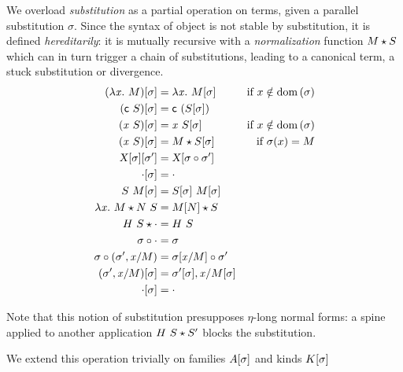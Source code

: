 \documentclass[9pt]{sigplanconf}
\begin{document}
We overload \emph{substitution} as a partial operation on terms, given
a parallel substitution $\sigma$. Since the syntax of object is not
stable by substitution, it is defined \emph{hereditarily}: it is
mutually recursive with a \emph{normalization} function ${M}\star{S}$
which can in turn trigger a chain of substitutions, leading to a
canonical term, a stuck substitution or divergence. %
\begin{align*}
  {(\lambda{\ensuremath{\text{\textit{x}}}}.\ M)}[{\sigma}] &= \lambda{\ensuremath{\text{\textit{x}}}}.\  {{M}[{\sigma}]} &
  \text{if $x\notin \operatorname{dom}{(\sigma)}$}
  \\
  {({\text{\textsf{c}}}\  S)}[{\sigma}] &= {\text{\textsf{c}}}\  {({S}[{\sigma}])}
  \\
  {({\text{\textit{x}}}\  S)}[{\sigma}] &=
  {\text{\textit{x}}}\  {{S}[{\sigma}]} &
  \text{if $x\notin \operatorname{dom}{(\sigma)}$}
  \\
  {({\text{\textit{x}}}\  S)}[{\sigma}] &=
  {M}\star{{S}[{\sigma}]} &
  \text{if $\sigma(x) = M$}
  \\
  {{\text{\textsl{X}}}[{\sigma}]}[{\sigma'}] &=
  {\text{\textsl{X}}}[{{\sigma}\circ{\sigma'}}]
  \\
  {\cdot}[{\sigma}] &=
  \cdot \\
  {{S}\ {M}}[{\sigma}] &=
  {{S}[{\sigma}]}\ {{M}[{\sigma}]}
  \\
  {\lambda{\ensuremath{\text{\textit{x}}}}.\  M}\star{{N}\ {S}} &=
  {{M}[{N}]}\star{S}
  \\
  {{H}\  S}\star{\cdot} &=
  {H}\  S
  \\
  {\sigma}\circ{\cdot} &=
  \sigma
  \\
  {\sigma}\circ{({\sigma'},{{\ensuremath{\text{\textit{x}}}}/{M}})} &=
  {{\sigma}[{{\text{\textit{x}}}/{M}}]}\circ{\sigma}'
  \\
  {({\sigma'},{{\text{\textit{x}}}/{M}})}[{\sigma}] &=
  {{\sigma'}[{\sigma}]},{{\text{\textit{x}}}/{{M}[{\sigma}]}}
  \\
  {\cdot}[{\sigma}] &= \cdot
\end{align*}

Note that this notion of substitution presupposes $\eta$-long normal
forms: a spine applied to another application ${{H}\  S}\star{S'}$
blocks the substitution.

We extend this operation trivially on families ${A}[{\sigma}]$
and kinds ${K}[{\sigma}]$

\end{document}
